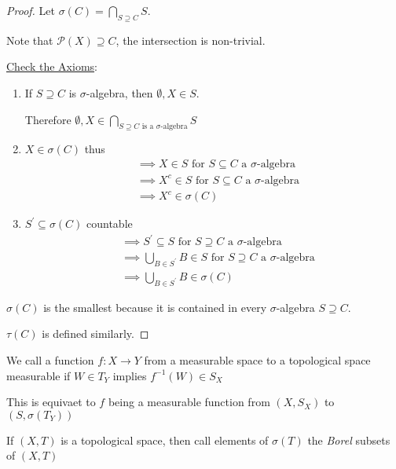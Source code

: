 \begin{proof}
	Let $\sigma(C) = \bigcap\limits_{S \supseteq C} S$.

	Note that $\mathcal{P}(X) \supseteq C$, the intersection is non-trivial.

	\underline{Check the Axioms}:
	\begin{enumerate}
		\item If $S \supseteq C$ is $\sigma$-algebra, then $\emptyset,X \in S$.

			Therefore  $\emptyset, X \in \bigcap \limits_{S \supseteq C \text{ is a $\sigma$-algebra}}S $
		\item $X \in \sigma(C)$ thus
			 \begin{align*}
			&\implies X \in S \text{ for } S \subseteq C \text{ a } \sigma\text{-algebra} \\
			&\implies X^{c} \in S \text{ for } S \subseteq C \text{ a } \sigma\text{-algebra} \\
			&\implies X^{c} \in \sigma(C)
			\end{align*} 

	\item $S^{'} \subseteq \sigma (C)$ countable
		 \begin{align*}
		&\implies S^{'} \subseteq S \text{ for } S \supseteq C \text{ a $\sigma$-algebra} \\
		&\implies \bigcup_{B \in S^{'}} B \in S \text{ for } S \supseteq C \text{ a $\sigma$-algebra} \\
		&\implies \bigcup_{B \in S^{'}} B \in \sigma(C)
		\end{align*} 
	\end{enumerate}

	$\sigma(C)$ is the smallest because it is contained in every $\sigma$-algebra $S \supseteq C$.

	 $\tau(C)$ is defined similarly.
\end{proof}

\begin{definition}
	We call a function $f:X \to Y$ from a measurable space to a topological space measurable if $W \in T_Y$ implies $f^{-1}(W) \in S_X$
\end{definition}

\begin{theorem}
	This is equivaet to $f$ being a measurable function from $(X, S_X)$ to $(S, \sigma(T_Y))$
\end{theorem}

\begin{example}
	If $(X,T)$ is a topological space, then call elements of $\sigma(T)$ the \emph{Borel} subsets of $(X,T)$	
\end{example}

